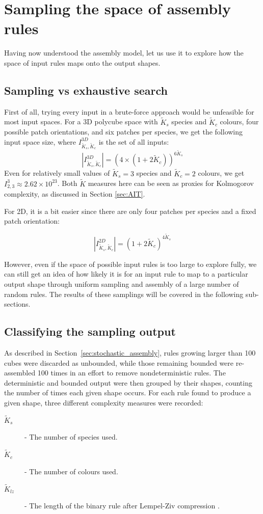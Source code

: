 \section{Sampling the space of assembly rules}
Having now understood the assembly model, let us use it to explore how the space of input rules maps onto the output shapes. 

\subsection{Sampling vs exhaustive search}
First of all, trying every input in a brute-force approach would be unfeasible for most input spaces. For a 3D polycube space with \(\widetilde{K}_s\) species and \(\widetilde{K}_c\) colours, four possible patch orientations, and six patches per species, we get the following input space size, where \(I_{\widetilde{K}_s, \widetilde{K}_c}^{3D}\) is the set of all inputs:
\[
\left\lvert I_{\widetilde{K}_s, \widetilde{K}_c}^{3D}\right\rvert = (4 \times (1+2\widetilde{K}_c))^{6\widetilde{K}_s}
\] Even for relatively small values of \(\widetilde{K}_s=3\) species and \(\widetilde{K}_c=2\) colours, we get \(I_{2, 3}^3 \approx 2.62 \times 10^{23}\). Both \(\widetilde{K}\) measures here can be seen as proxies for Kolmogorov complexity, as discussed in Section \ref{sec:AIT}.

For 2D, it is a bit easier since there are only four patches per species and a fixed patch orientation:

\[
\left\lvert I_{\widetilde{K}_s, \widetilde{K}_c}^{2D}\right\rvert = (1+2\widetilde{K}_c)^{4\widetilde{K}_s}
\]

However, even if the space of possible input rules is too large to explore fully, we can still get an idea of how likely it is for an input rule to map to a particular output shape through uniform sampling and assembly of a large number of random rules. The results of these samplings will be covered in the following sub-sections. 

\subsection{Classifying the sampling output}
As described in Section~\ref{sec:stochastic_assembly}, rules growing larger than 100 cubes were discarded as unbounded, while those remaining bounded were re-assembled 100 times in an effort to remove nondeterministic rules. The deterministic and bounded output were then grouped by their shapes, counting the number of times each given shape occurs. For each rule found to produce a given shape, three different complexity measures were recorded:
\begin{description}
    \item[\(\widetilde{K}_s\)] - The number of species used.
    \item[\(\widetilde{K}_c\)] - The number of colours used.
    \item[\(\widetilde{K}_{lz}\)] - The length of the binary rule after Lempel-Ziv compression \cite{lempel-ziv}. 
\end{description}

